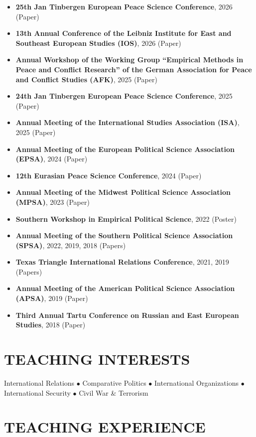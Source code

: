 \documentclass[11pt,a4paper,roman]{moderncv}
\begin{document}
	\begin{itemize}
		\item \textbf{25th Jan Tinbergen European Peace Science Conference}, 2026 (Paper)
		\item \textbf{13th Annual Conference of the Leibniz Institute for East and Southeast European Studies (IOS)}, 2026 (Paper)
		\item \textbf{Annual Workshop of the Working Group ``Empirical Methods in Peace and Conflict Research'' of the German Association for Peace and Conflict Studies (AFK)}, 2025 (Paper)
		\item \textbf{24th Jan Tinbergen European Peace Science Conference}, 2025 (Paper)
		\item \textbf{Annual Meeting of the International Studies Association (ISA)}, 2025 (Paper)
		\item \textbf{Annual Meeting of the European Political Science Association (EPSA)}, 2024 (Paper)
		\item \textbf{12th Eurasian Peace Science Conference}, 2024 (Paper)
		\item \textbf{Annual Meeting of the Midwest Political Science Association (MPSA)}, 2023 (Paper)
		\item \textbf{Southern Workshop in Empirical Political Science}, 2022 (Poster)
		\item \textbf{Annual Meeting of the Southern Political Science Association (SPSA)}, 2022, 2019, 2018 (Papers)
		\item \textbf{Texas Triangle International Relations Conference}, 2021, 2019 (Papers)
		\item \textbf{Annual Meeting of the American Political Science Association (APSA)}, 2019 (Paper)
		\item \textbf{Third Annual Tartu Conference on Russian and East European Studies}, 2018 (Paper)
	\end{itemize}
	
	\section{TEACHING INTERESTS}
	
	International Relations $\bullet$ Comparative Politics $\bullet$ International Organizations $\bullet$ International Security $\bullet$ Civil War \& Terrorism
	
	\section{TEACHING EXPERIENCE}
	
\end{document}
